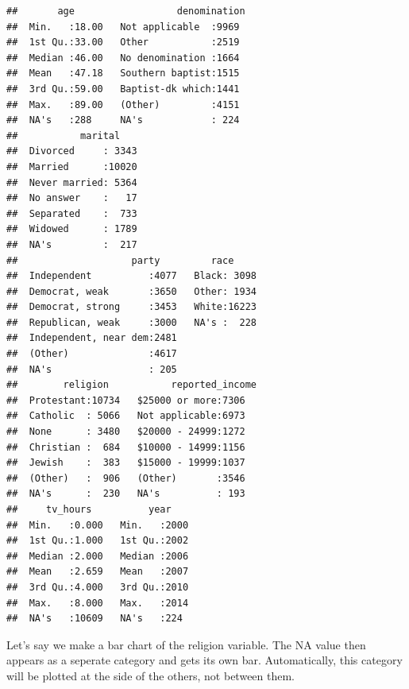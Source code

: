 \documentclass[]{tufte-book}
\newenvironment{Shaded}{}{}
\newcommand{\KeywordTok}[1]{\textcolor[rgb]{0.00,0.44,0.13}{\textbf{#1}}}
\newcommand{\StringTok}[1]{\textcolor[rgb]{0.25,0.44,0.63}{#1}}
\newcommand{\OperatorTok}[1]{\textcolor[rgb]{0.40,0.40,0.40}{#1}}
\newcommand{\NormalTok}[1]{#1}
\begin{document}
\begin{verbatim}
##       age                  denomination 
##  Min.   :18.00   Not applicable  :9969  
##  1st Qu.:33.00   Other           :2519  
##  Median :46.00   No denomination :1664  
##  Mean   :47.18   Southern baptist:1515  
##  3rd Qu.:59.00   Baptist-dk which:1441  
##  Max.   :89.00   (Other)         :4151  
##  NA's   :288     NA's            : 224  
##           marital     
##  Divorced     : 3343  
##  Married      :10020  
##  Never married: 5364  
##  No answer    :   17  
##  Separated    :  733  
##  Widowed      : 1789  
##  NA's         :  217  
##                    party         race      
##  Independent          :4077   Black: 3098  
##  Democrat, weak       :3650   Other: 1934  
##  Democrat, strong     :3453   White:16223  
##  Republican, weak     :3000   NA's :  228  
##  Independent, near dem:2481                
##  (Other)              :4617                
##  NA's                 : 205                
##        religion           reported_income
##  Protestant:10734   $25000 or more:7306  
##  Catholic  : 5066   Not applicable:6973  
##  None      : 3480   $20000 - 24999:1272  
##  Christian :  684   $10000 - 14999:1156  
##  Jewish    :  383   $15000 - 19999:1037  
##  (Other)   :  906   (Other)       :3546  
##  NA's      :  230   NA's          : 193  
##     tv_hours          year     
##  Min.   :0.000   Min.   :2000  
##  1st Qu.:1.000   1st Qu.:2002  
##  Median :2.000   Median :2006  
##  Mean   :2.659   Mean   :2007  
##  3rd Qu.:4.000   3rd Qu.:2010  
##  Max.   :8.000   Max.   :2014  
##  NA's   :10609   NA's   :224
\end{verbatim}

Let's say we make a bar chart of the religion variable. The NA value
then appears as a seperate category and gets its own bar. Automatically,
this category will be plotted at the side of the others, not between
them.

\begin{Shaded}
\end{Shaded}
\end{document}
